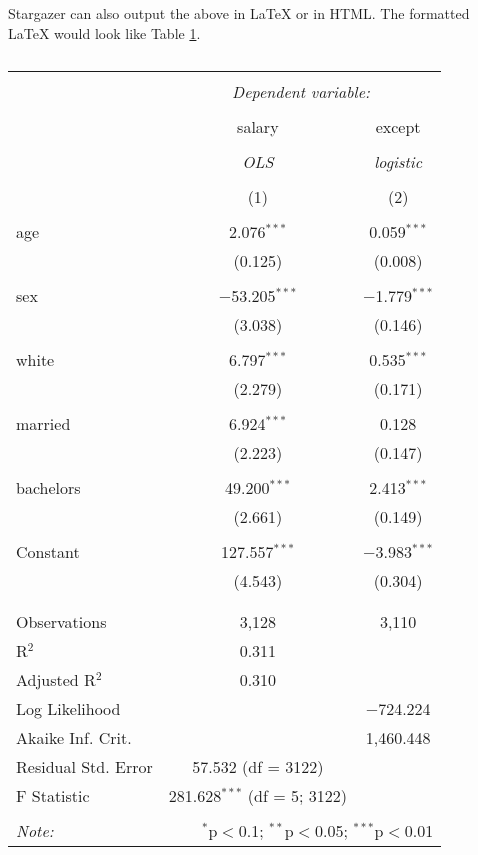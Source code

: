 \documentclass[12pt, oneside]{amsart}   	%
\begin{document}
Stargazer can also output the above in LaTeX or in HTML. The formatted LaTeX would look like Table \ref{tab:stargazer}.

\begin{table}[!htbp] \centering 
  \caption{} 
  \label{tab:stargazer} 
\begin{tabular}{@{\extracolsep{5pt}}lcc} 
\\[-1.8ex]\hline 
\hline \\[-1.8ex] 
 & \multicolumn{2}{c}{\textit{Dependent variable:}} \\ 
\cline{2-3} 
\\[-1.8ex] & salary & except \\ 
\\[-1.8ex] & \textit{OLS} & \textit{logistic} \\ 
\\[-1.8ex] & (1) & (2)\\ 
\hline \\[-1.8ex] 
 age & 2.076$^{***}$ & 0.059$^{***}$ \\ 
  & (0.125) & (0.008) \\ 
  & & \\ 
 sex & $-$53.205$^{***}$ & $-$1.779$^{***}$ \\ 
  & (3.038) & (0.146) \\ 
  & & \\ 
 white & 6.797$^{***}$ & 0.535$^{***}$ \\ 
  & (2.279) & (0.171) \\ 
  & & \\ 
 married & 6.924$^{***}$ & 0.128 \\ 
  & (2.223) & (0.147) \\ 
  & & \\ 
 bachelors & 49.200$^{***}$ & 2.413$^{***}$ \\ 
  & (2.661) & (0.149) \\ 
  & & \\ 
 Constant & 127.557$^{***}$ & $-$3.983$^{***}$ \\ 
  & (4.543) & (0.304) \\ 
  & & \\ 
\hline \\[-1.8ex] 
Observations & 3,128 & 3,110 \\ 
R$^{2}$ & 0.311 &  \\ 
Adjusted R$^{2}$ & 0.310 &  \\ 
Log Likelihood &  & $-$724.224 \\ 
Akaike Inf. Crit. &  & 1,460.448 \\ 
Residual Std. Error & 57.532 (df = 3122) &  \\ 
F Statistic & 281.628$^{***}$ (df = 5; 3122) &  \\ 
\hline 
\hline \\[-1.8ex] 
\textit{Note:}  & \multicolumn{2}{r}{$^{*}$p$<$0.1; $^{**}$p$<$0.05; $^{***}$p$<$0.01} \\ 
\end{tabular} 
\end{table} 
\end{document}
